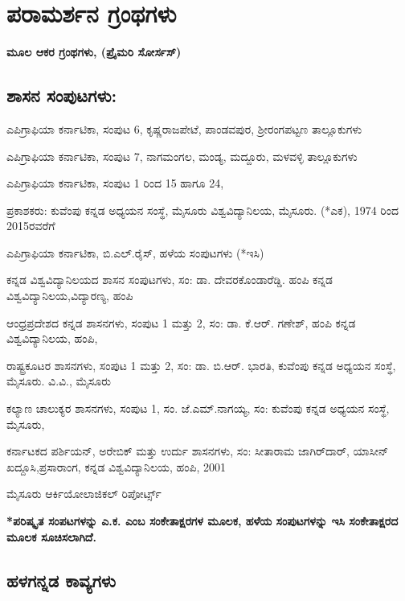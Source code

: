 \chapter*{ಪರಾಮರ್ಶನ ಗ್ರಂಥಗಳು}

\begin{center}
\textbf{ಮೂಲ ಆಕರ ಗ್ರಂಥಗಳು, (ಪ್ರೈಮರಿ ಸೋರ್ಸಸ್​)}
\end{center}


\section*{ಶಾಸನ ಸಂಪುಟಗಳು:}

\noindent
ಎಪಿಗ್ರಾಫಿಯಾ ಕರ್ನಾಟಿಕಾ, ಸಂಪುಟ 6, ಕೃಷ್ಣರಾಜಪೇಟೆ, ಪಾಂಡವಪುರ, ಶ‍್ರೀರಂಗಪಟ್ಟಣ ತಾಲ್ಲೂಕುಗಳು 

\noindent
ಎಪಿಗ್ರಾಫಿಯಾ ಕರ್ನಾಟಿಕಾ, ಸಂಪುಟ 7, ನಾಗಮಂಗಲ, ಮಂಡ್ಯ, ಮದ್ದೂರು, ಮಳವಳ್ಳಿ ತಾಲ್ಲೂಕುಗಳು

\noindent
ಎಪಿಗ್ರಾಫಿಯಾ ಕರ್ನಾಟಿಕಾ, ಸಂಪುಟ 1 ರಿಂದ 15 ಹಾಗೂ 24, 

\noindent
ಪ್ರಕಾಶಕರು: ಕುವೆಂಪು ಕನ್ನಡ ಅಧ್ಯಯನ ಸಂಸ್ಥೆ, ಮೈಸೂರು ವಿಶ್ವವಿದ್ಯಾನಿಲಯ, ಮೈಸೂರು. (*ಎಕ), 1974 ರಿಂದ 2015ರವರೆಗೆ

\noindent
ಎಪಿಗ್ರಾಫಿಯಾ ಕರ್ನಾಟಿಕಾ, ಬಿ.ಎಲ್​.ರೈಸ್​, ಹಳೆಯ ಸಂಪುಟಗಳು (*ಇಸಿ)

\noindent
ಕನ್ನಡ ವಿಶ್ವವಿದ್ಯಾನಿಲಯದ ಶಾಸನ ಸಂಪುಟಗಳು, ಸಂ: ಡಾ. ದೇವರಕೊಂಡಾರೆಡ್ಡಿ. ಹಂಪಿ ಕನ್ನಡ ವಿಶ್ವವಿದ್ಯಾನಿಲಯ,\break ವಿದ್ಯಾರಣ್ಯ, ಹಂಪಿ

\noindent
ಆಂಧ್ರಪ್ರದೇಶದ ಕನ್ನಡ ಶಾಸನಗಳು, ಸಂಪುಟ 1 ಮತ್ತು 2, ಸಂ: ಡಾ. ಕೆ.ಆರ್​. ಗಣೇಶ್​, ಹಂಪಿ ಕನ್ನಡ ವಿಶ್ವವಿದ್ಯಾನಿಲಯ, ಹಂಪಿ,

\noindent
ರಾಷ್ಟ್ರಕೂಟರ ಶಾಸನಗಳು, ಸಂಪುಟ 1 ಮತ್ತು 2, ಸಂ: ಡಾ. ಬಿ.ಆರ್​. ಭಾರತಿ, ಕುವೆಂಪು ಕನ್ನಡ ಅಧ್ಯಯನ ಸಂಸ್ಥೆ, ಮೈಸೂರು. ವಿ.ವಿ., ಮೈಸೂರು

\noindent
ಕಲ್ಯಾಣ ಚಾಲುಕ್ಯರ ಶಾಸನಗಳು, ಸಂಪುಟ 1, ಸಂ. ಜೆ.ಎಮ್.ನಾಗಯ್ಯ, ಸಂ: ಕುವೆಂಪು ಕನ್ನಡ ಅಧ್ಯಯನ ಸಂಸ್ಥೆ, ಮೈಸೂರು,

\noindent
ಕರ್ನಾಟಕದ ಪರ್ಶಿಯನ್​, ಅರೇಬಿಕ್​ ಮತ್ತು ಉರ್ದು ಶಾಸನಗಳು, ಸಂ: ಸೀತಾರಾಮ ಜಾಗಿರ್​ದಾರ್​, ಯಾಸೀನ್​\break ಖದ್ದೂಸಿ,ಪ್ರಸಾರಾಂಗ, ಕನ್ನಡ ವಿಶ್ವವಿದ್ಯಾನಿಲಯ, ಹಂಪಿ, 2001

\noindent
ಮೈಸೂರು ಆರ್ಕಿಯೋಲಾಜಿಕಲ್​ ರಿಪೋರ್ಟ್ಸ್

\noindent
\textbf{*ಪರಿಷ್ಕೃತ ಸಂಪಟಗಳನ್ನು ಎ.ಕ. ಎಂಬ ಸಂಕೇತಾಕ್ಷರಗಳ ಮೂಲಕ, ಹಳೆಯ ಸಂಪುಟಗಳನ್ನು ಇಸಿ ಸಂಕೇತಾಕ್ಷರದ ಮೂಲಕ ಸೂಚಿಸಲಾಗಿದೆ.}


\section*{ಹಳಗನ್ನಡ ಕಾವ್ಯಗಳು}

